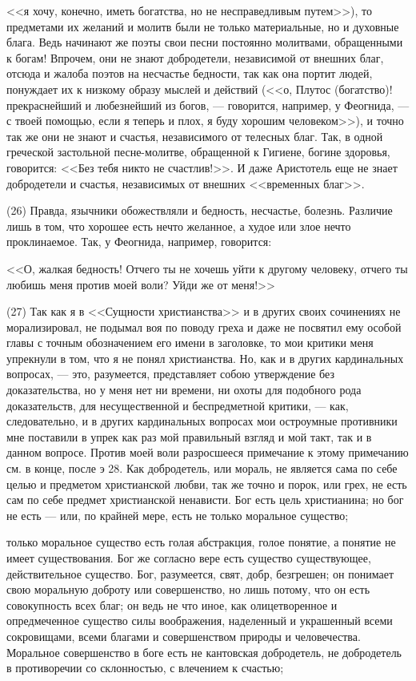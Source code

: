 \documentclass[12pt]{article}
\begin{document}
<<я хочу, конечно, иметь богатства, но не несправедливым путем>>), то предметами их желаний и молитв были не только материальные, но и духовные блага. Ведь начинают же поэты свои песни постоянно молитвами, обращенными к богам! Впрочем, они не знают добродетели, независимой от внешних благ, отсюда и жалоба поэтов на несчастье бедности, так как она портит людей, понуждает их к низкому образу мыслей и действий (<<о, Плутос (богатство)! прекраснейший и любезнейший из богов, --- говорится, например, у Феогнида, --- с твоей помощью, если я теперь и плох, я буду хорошим человеком>>), и точно так же они не знают и счастья, независимого от телесных благ. Так, в одной греческой застольной песне-молитве, обращенной к Гигиене, богине здоровья, говорится: <<Без тебя никто не счастлив!>>. И даже Аристотель еще не знает добродетели и счастья, независимых от внешних <<временных благ>>. 

(26) Правда, язычники обожествляли и бедность, несчастье, болезнь. Различие лишь в том, что хорошее есть нечто желанное, а худое или злое нечто проклинаемое. Так, у Феогнида, например, говорится: 

<<О, жалкая бедность! Отчего ты не хочешь уйти к другому человеку, отчего ты любишь меня против моей воли? Уйди же от меня!>> 

(27) Так как я в <<Сущности христианства>> и в других своих сочинениях не морализировал, не подымал воя по поводу греха и даже не посвятил ему особой главы с точным обозначением его имени в заголовке, то мои критики меня упрекнули в том, что я не понял христианства. Но, как и в других кардинальных вопросах, --- это, разумеется, представляет собою утверждение без доказательства, но у меня нет ни времени, ни охоты для подобного рода доказательств, для несущественной и беспредметной критики, --- как, следовательно, и в других кардинальных вопросах мои остроумные противники мне поставили в упрек как раз мой правильный взгляд и мой такт, так и в данном вопросе. Против моей воли разросшееся примечание к этому примечанию см. в конце, после э 28. Как добродетель, или мораль, не является сама по себе целью и предметом христианской любви, так же точно и порок, или грех, не есть сам по себе предмет христианской ненависти. Бог есть цель христианина; но бог не есть --- или, по крайней мере, есть не только моральное существо; 

только моральное существо есть голая абстракция, голое понятие, а понятие не имеет существования. Бог же согласно вере есть существо существующее, действительное существо. Бог, разумеется, свят, добр, безгрешен; он понимает свою моральную доброту или совершенство, но лишь потому, что он есть совокупность всех благ; он ведь не что иное, как олицетворенное и опредмеченное существо силы воображения, наделенный и украшенный всеми сокровищами, всеми благами и совершенством природы и человечества. Моральное совершенство в боге есть не кантовская добродетель, не добродетель в противоречии со склонностью, с влечением к счастью; 
\end{document}
